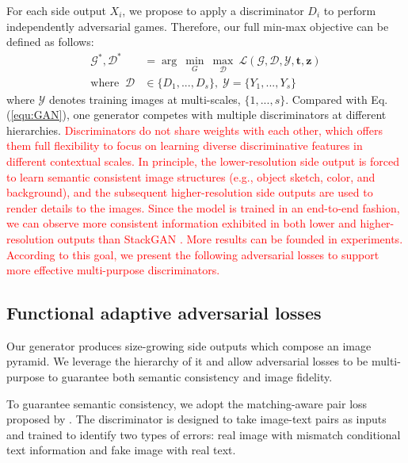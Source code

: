 \documentclass[10pt,twocolumn,letterpaper]{article}
\begin{document}
For each side output $X_i$, we propose to apply a discriminator $D_i$ to perform independently adversarial games. Therefore, our full min-max objective can be defined as follows: 
\begin{equation}
\label{equ:optim}
\begin{split}
  \mathcal{G}^*, \mathcal{D}^*&  =  \arg~\underset{G}{\min}\ \underset{\mathcal{D}}{\max}~ \mathcal{L}(\mathcal{G},\mathcal{D}, \mathcal{Y}, \bm t, \bm z) \\
  \text{where} \;\;	 \mathcal{D} & \in  \{D_1, ..., D_s\}, \; \mathcal{Y} = \{Y_1, ..., Y_s\}
\end{split}
\end{equation}
where $ \mathcal{Y}$ denotes training images at multi-scales, $\{1,...,s\}$.
Compared with Eq. (\ref{equ:GAN}), one generator competes with multiple discriminators at different hierarchies. 
\textcolor{red}{Discriminators do not share weights with each other, which offers them full flexibility to focus on learning diverse discriminative features in different contextual scales.
In principle, the lower-resolution side output is forced to learn semantic consistent image structures (e.g., object sketch, color, and background), and the subsequent higher-resolution side outputs are used to render details to the images. 
Since the model is trained in an end-to-end fashion, we can observe more consistent information exhibited in both lower and higher-resolution outputs than StackGAN \cite{han2017stackgan}. More results can be founded in experiments. 
According to this goal, we present the following adversarial losses to support more effective multi-purpose discriminators.}



\subsection{Functional adaptive adversarial losses}
Our generator produces size-growing side outputs which compose an image pyramid. 
We leverage the hierarchy of it and allow adversarial losses to be multi-purpose to guarantee both semantic consistency and image fidelity. 

To guarantee semantic consistency, we adopt the matching-aware pair loss proposed by \cite{reed2016generative}. The discriminator is designed to take image-text pairs as inputs and trained to identify two types of errors: real image with mismatch conditional text information and fake image with real text.
\end{document}
